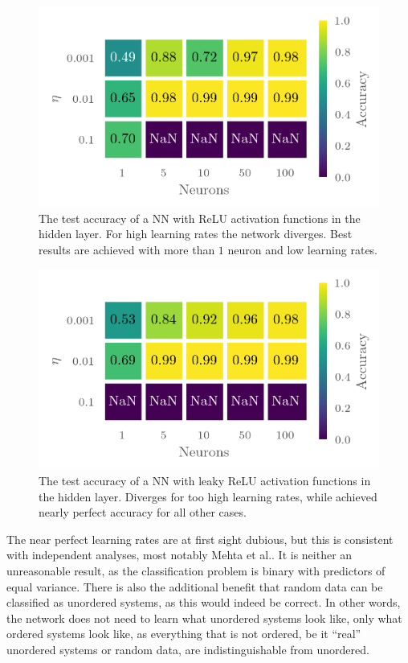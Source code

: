\begin{figure}[H]
  \centering
  \includegraphics[]{figures/relugrid.png}
  \caption{\label{fig:relu_grid} The test accuracy of a NN with ReLU activation
  functions in the hidden layer. For high learning rates the network diverges.
  Best results are achieved with more than \(1\) neuron and low learning rates.}
\end{figure}

\begin{figure}[H]
  \centering
  \includegraphics[]{figures/leakygrid.png}
  \caption{\label{fig:leaky_grid} The test accuracy of a NN with leaky ReLU
    activation functions in the hidden layer. Diverges for too high learning
    rates, while achieved nearly perfect accuracy for all other cases.}
\end{figure}

The near perfect learning rates are at first sight dubious, but this is
consistent with independent analyses, most notably Mehta et al.\cite{mehta}. It
is neither an unreasonable result, as the classification problem is binary with
predictors of equal variance. There is also the additional benefit that random
data can be classified as unordered systems, as this would indeed be correct. In
other words, the network does not need to learn what unordered systems look
like, only what ordered systems look like, as everything that is not ordered, be
it ``real'' unordered systems or random data, are indistinguishable from unordered.

